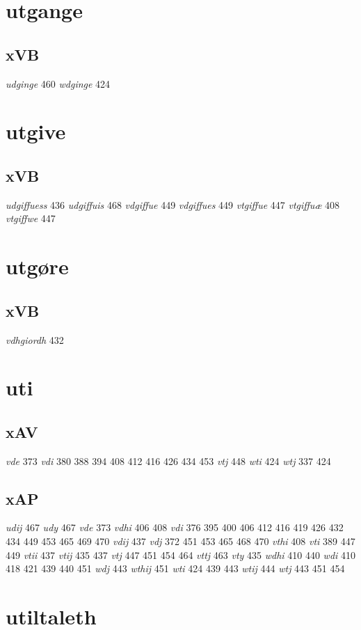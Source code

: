 \documentclass[a4paper,twocolumn]{article}
\begin{document}
\section{utgange}
\label{sec:orgf42a170}
\subsection{xVB}
\label{sec:orgd7a5718}
\emph{udginge} 460 \emph{wdginge} 424 
\section{utgive}
\label{sec:orgd248cfe}
\subsection{xVB}
\label{sec:org8b5346c}
\emph{udgiffuess} 436 \emph{udgiffuis} 468 \emph{vdgiffue} 449 \emph{vdgiffues} 449 \emph{vtgiffue} 447 \emph{vtgiffuæ} 408 \emph{vtgiffwe} 447 
\section{utgøre}
\label{sec:org8c072c0}
\subsection{xVB}
\label{sec:orgd7c298f}
\emph{vdhgiordh} 432 
\section{uti}
\label{sec:orge54446c}
\subsection{xAV}
\label{sec:orgff42fcb}
\emph{vde} 373 \emph{vdi} 380 388 394 408 412 416 426 434 453 \emph{vtj} 448 \emph{wti} 424 \emph{wtj} 337 424 
\subsection{xAP}
\label{sec:org3e2a2f4}
\emph{udij} 467 \emph{udy} 467 \emph{vde} 373 \emph{vdhi} 406 408 \emph{vdi} 376 395 400 406 412 416 419 426 432 434 449 453 465 469 470 \emph{vdij} 437 \emph{vdj} 372 451 453 465 468 470 \emph{vthi} 408 \emph{vti} 389 447 449 \emph{vtii} 437 \emph{vtij} 435 437 \emph{vtj} 447 451 454 464 \emph{vttj} 463 \emph{vty} 435 \emph{wdhi} 410 440 \emph{wdi} 410 418 421 439 440 451 \emph{wdj} 443 \emph{wthij} 451 \emph{wti} 424 439 443 \emph{wtij} 444 \emph{wtj} 443 451 454 
\section{utiltaleth}
\label{sec:org205ee64}
\end{document}
